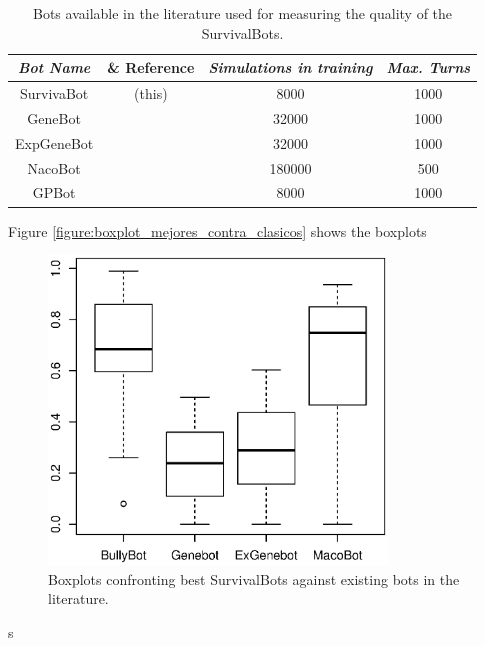 \documentclass[conference]{IEEEtran}
\begin{document}
\begin{table}
\begin{center}
\begin{tabular}{|c|c|c|c|}
\hline
{\em Bot Name} & {\& Reference} & {\em Simulations in training} & {\em Max. Turns} \\\hline \hline
SurvivaBot & (this) & 8000 & 1000 \\ \hline
GeneBot & \cite{Genebot_JCST} & 32000 & 1000 \\ \hline
ExpGeneBot & \cite{Genebot_CIG2012} & 32000 & 1000 \\ \hline
NacoBot & \cite{NogueiraCoevolutionary14} & 180000 & 500 \\ \hline
GPBot & \cite{GarciaGP14} & 8000 & 1000 \\ \hline


\end{tabular}
\caption{Bots available in the literature used for measuring the quality of the SurvivalBots.}     %
\label{tab:literaturebots}
\end{center}
\end{table}



Figure \ref{figure:boxplot_mejores_contra_clasicos} shows the boxplots

\begin{figure}[htb]
\tiny
\begin{center}
    \includegraphics[width=9cm]{./imags/boxplot_mejores_contra_clasicos.eps}

\end{center}
\caption{Boxplots confronting best SurvivalBots against existing bots in the literature.}
\label{figura:tarta_decissions}
\end{figure}s
\end{document}
